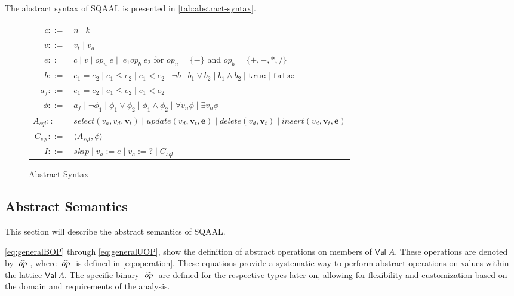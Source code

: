 The abstract syntax of SQAAL is presented in \autoref{tab:abstract-syntax}.
\begin{figure}[htb!]
    \center
    \begin{tabular}{r p{}}
        $c ::=$ & $n \mid k$ \\
        $v ::=$ & $v_t \mid v_a$ \\
        $e ::=$ & $c \mid v \mid op_u\; e \mid \;e_1 op_b\; e_2$ for $op_u = \{-\}$ and $op_b = \{+, -, *, / \}$ \\

        $b ::=$ & $e_1 = e_2 \mid e_1 \leq e_2 \mid e_1 < e_2 \mid \neg b \mid b_1 \lor b_2 \mid b_1 \land b_2 \mid \texttt{true} \mid \texttt{false}$ \\

        $a_f ::=$ & $e_1 = e_2 \mid e_1 \leq e_2 \mid e_1 < e_2$ \\
        $\phi ::=$ & $a_f \mid \neg \phi_1 \mid \phi_1 \lor \phi_2 \mid \phi_1 \land \phi_2 \mid \forall v_n \phi \mid \exists v_n \phi$ \\
        $A_{sql} :: =$ & $select(v_a, v_d, \mathbf{v}_t) \mid update(v_d, \mathbf{v}_t, \mathbf{e}) \mid delete(v_d, \mathbf{v}_t) \mid insert(v_d, \mathbf{v}_t, \mathbf{e})$ \\
        $C_{sql} ::=$ & $\langle A_{sql}, \phi \rangle $ \\
        $I ::=$ & $skip \mid v_a := e \mid v_a := ? \mid C_{sql} $\\
    \end{tabular}
    \caption{Abstract Syntax}
    \label{tab:abstract-syntax}
\end{figure}

\subsection{Abstract Semantics}\label{subsec:abstract-semantics}
This section will describe the abstract semantics of SQAAL.

\autoref{eq:generalBOP} through \ref{eq:generalUOP}, show the definition of abstract operations on members of $\mathsf{Val} \; A$.
These operations are denoted by $\;\widehat{op}\;$, where $\;\widehat{op}\;$ is defined in \autoref{eq:operation}.
These equations provide a systematic way to perform abstract operations on values within the lattice $\mathsf{Val} \ A$.
The specific binary $\;\widetilde{op}\;$ are defined for the respective types later on, allowing for flexibility and customization based on the domain and requirements of the analysis.

